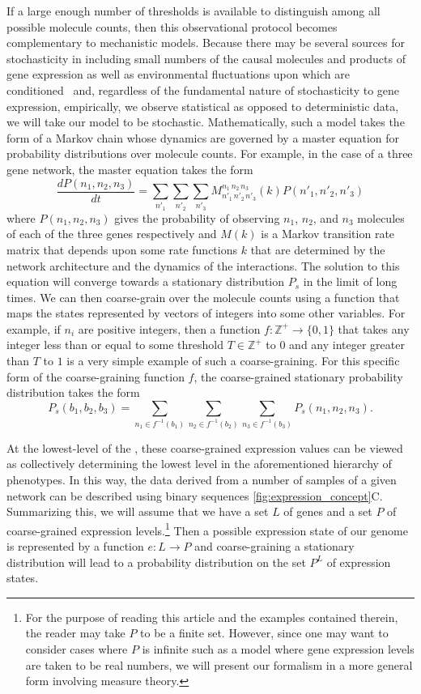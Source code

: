 If a large enough number of thresholds is available to distinguish among all possible molecule counts, then this observational protocol becomes complementary to mechanistic models.  Because there may be several sources for stochasticity in \gnpm{} including small numbers of the causal molecules and products of gene expression as well as environmental fluctuations upon which \gnpm{} are conditioned~\cite{Swain2002,Paulsson2004,Thattai2004,Acar2008a,Lestas2010,Munsky2012,Chalancon2012,Neuert2013,Sanchez2013} and, regardless of the fundamental nature of stochasticity to gene expression, empirically, we observe statistical as opposed to deterministic data, we will take our model to be stochastic.  Mathematically, such a model takes the form of a Markov chain whose dynamics are governed by a master equation for probability distributions over molecule counts.   For example, in the case of a three gene network, the master equation takes the form
$$
\frac{dP(n_1,n_2,n_3)}{dt} = \sum_{n'_1}\sum_{n'_2}\sum_{n'_3} M^{n_1\,n_2\,n_3}_{n'_1\,n'_2\,n'_3}(k) P(n'_1,n'_2,n'_3)
$$
where $P(n_1,n_2,n_3)$ gives the probability of observing $n_1$, $n_2$, and $n_3$ molecules of each of the three genes respectively and $M(k)$ is a Markov transition rate matrix that depends upon some rate functions $k$ that are determined by the network architecture and the dynamics of the interactions.  The solution to this equation will converge towards  a stationary distribution $P_s$ in the limit of long times. We can then coarse-grain over the molecule counts using a function that maps the states represented by vectors of integers into some other variables. For example, if $n_i$ are positive integers, then a function $f \colon \mathbb{Z}^+ \rightarrow \{0,1\}$ that takes any integer less than or equal to some threshold $T \in \mathbb{Z}^+$ to $0$ and any integer greater than $T$ to $1$ is a very simple example of such a coarse-graining. For this specific form of the coarse-graining function $f$, the coarse-grained stationary probability distribution takes the form
$$
P_s(b_1,b_2,b_3) = \sum_{n_1 \in f^{-1}(b_1)}\sum_{n_2 \in f^{-1}(b_2)}\sum_{n_3 \in f^{-1}(b_3)} P_s(n_1,n_2,n_3).
$$

At the lowest-level of the \gnpm{}, these coarse-grained expression values can be viewed as collectively determining the lowest level in the aforementioned hierarchy of phenotypes. In this way, the data derived from a number of samples of a given network can be described using binary sequences \ref{fig:expression_concept}C.  Summarizing this, we will assume that we have a set $L$ of genes and a set $P$ of coarse-grained expression levels.\footnote{For the purpose of reading this article and the examples contained therein, the reader may take $P$ to be a finite set.  However, since one may want to consider cases where $P$ is infinite such as a model where gene expression levels are taken to be real numbers, we will present our formalism in a more general form involving measure theory.}  Then a possible expression state of our genome is represented by a function $e : L \to P$ and coarse-graining a stationary distribution will lead to a probability distribution on the set $P^L$ of expression states.

